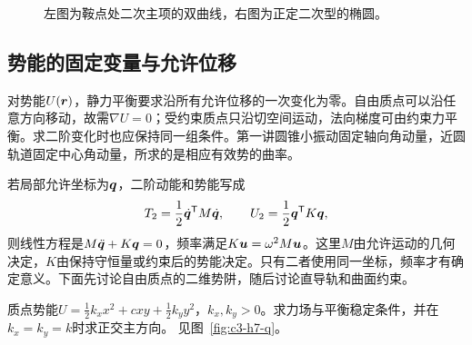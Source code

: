 \begin{solution}
\begin{figure}[H]\centering
{}
\caption{左图为鞍点处二次主项的双曲线，右图为正定二次型的椭圆。}\label{fig:c3-e3-s}
\end{figure}
\end{solution}








\subsection{势能的固定变量与允许位移}
对势能$U(\bm{r})$，静力平衡要求沿所有允许位移的一次变化为零。自由质点可以沿任意方向移动，故需$\nabla U=0$；受约束质点只沿切空间运动，法向梯度可由约束力平衡。求二阶变化时也应保持同一组条件。第一讲圆锥小振动固定轴向角动量，近圆轨道固定中心角动量，所求的是相应有效势的曲率。

若局部允许坐标为$\bm{q}$，二阶动能和势能写成
\[T_2=\frac12\dot{\bm{q}}^{\mathsf T}M\dot{\bm{q}},\qquad
U_2=\frac12\bm{q}^{\mathsf T}K\bm{q},\]
则线性方程是$M\ddot{\bm{q}}+K\bm{q}=0$，频率满足$K\bm{u}=\omega^2M\bm{u}$。这里$M$由允许运动的几何决定，$K$由保持守恒量或约束后的势能决定。只有二者使用同一坐标，频率才有确定意义。下面先讨论自由质点的二维势阱，随后讨论直导轨和曲面约束。
\begin{exercise}[各向异性势阱中的平衡]\label{ex:c3-h7}
质点势能$U=\frac12k_xx^2+cxy+\frac12k_yy^2$，$k_x,k_y>0$。求力场与平衡稳定条件，并在$k_x=k_y=k$时求正交主方向。 见图~\ref{fig:c3-h7-q}。
\end{exercise}


